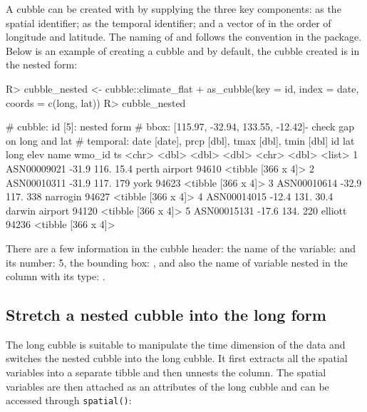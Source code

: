 \documentclass[
]{jss}
\begin{document}
A cubble can be created with  by supplying the three
key components:  as the spatial identifier;  as
the temporal identifier; and a vector of  in the order of
longitude and latitude. The naming of  and 
follows the convention in the  package. Below is an example
of creating a cubble and by default, the cubble created is in the nested
form:

\begin{CodeChunk}
\begin{CodeInput}
R> cubble_nested <- cubble::climate_flat %
+   as_cubble(key = id, index = date, coords = c(long, lat))
R> cubble_nested
\end{CodeInput}
\begin{CodeOutput}
# cubble:   id [5]: nested form
# bbox:     [115.97, -32.94, 133.55, -12.42]- check gap on long and lat
# temporal: date [date], prcp [dbl], tmax [dbl], tmin [dbl]
  id            lat  long  elev name           wmo_id ts                
  <chr>       <dbl> <dbl> <dbl> <chr>           <dbl> <list>            
1 ASN00009021 -31.9  116.  15.4 perth airport   94610 <tibble [366 x 4]>
2 ASN00010311 -31.9  117. 179   york            94623 <tibble [366 x 4]>
3 ASN00010614 -32.9  117. 338   narrogin        94627 <tibble [366 x 4]>
4 ASN00014015 -12.4  131.  30.4 darwin airport  94120 <tibble [366 x 4]>
5 ASN00015131 -17.6  134. 220   elliott         94236 <tibble [366 x 4]>
\end{CodeOutput}
\end{CodeChunk}

There are a few information in the cubble header: the name of the
 variable:  and its number: 5, the bounding box:
\code{[115.97, -32.94, 133.55, -12.42]} , and also the name of variable
nested in the  column with its type:
.

\hypertarget{stretch-a-nested-cubble-into-the-long-form}{%
\subsection{Stretch a nested cubble into the long
form}\label{stretch-a-nested-cubble-into-the-long-form}}

The long cubble is suitable to manipulate the time dimension of the data
and  switches the nested cubble into the long cubble. It
first extracts all the spatial variables into a separate tibble and then
unnests the  column. The spatial variables are then attached as
an attributes of the long cubble and can be accessed through
\texttt{spatial()}:
\end{document}
